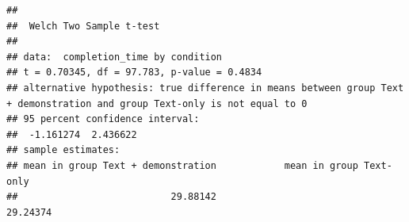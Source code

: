 \documentclass[
]{article}
\begin{document}
\begin{verbatim}
## 
##  Welch Two Sample t-test
## 
## data:  completion_time by condition
## t = 0.70345, df = 97.783, p-value = 0.4834
## alternative hypothesis: true difference in means between group Text + demonstration and group Text-only is not equal to 0
## 95 percent confidence interval:
##  -1.161274  2.436622
## sample estimates:
## mean in group Text + demonstration            mean in group Text-only 
##                           29.88142                           29.24374
\end{verbatim}
\end{document}
